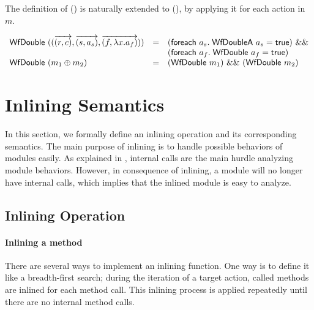 The definition of () is naturally extended to
(), by applying it for each action in $m$.

\begin{definition}
  \label{def-wfdouble}
  \mbox{}
  \begin{center}
    \begin{math}
      \begin{array}{lcl}
        \wfdouble{(\modbasic{\regpair{r}{c}}{\rulepair{s}{a_s}}{\methodpair{f}{\lambda x.a_f}})} & =
        & (\wordforeach{} a_s.\; \wfdoublea{a_s} = \btrue)\ \band{} \\
        & & (\wordforeach{} a_f.\; \wfdouble{a_f} = \btrue) \\
        \wfdouble{(\modcomp{m_1}{m_2})} & = & (\wfdouble{m_1})\ \band{}\ (\wfdouble{m_2}) \\
      \end{array}
    \end{math}
  \end{center}
\end{definition}

\section{Inlining Semantics}
\label{sec:inlining-semantics}

In this section, we formally define an inlining operation and its
corresponding semantics. The main purpose of inlining is to handle
possible behaviors of modules easily. As explained in
, internal calls are the main hurdle
analyzing module behaviors. However, in consequence of inlining, a
module will no longer have internal calls, which implies that the
inlined module is easy to analyze.

\subsection{Inlining Operation}

\paragraph{Inlining a method}
There are several ways to implement an inlining function. One way is
to define it like a breadth-first search; during the iteration of a
target action, called methods are inlined for each method call. This
inlining process is applied repeatedly until there are no internal
method calls.


